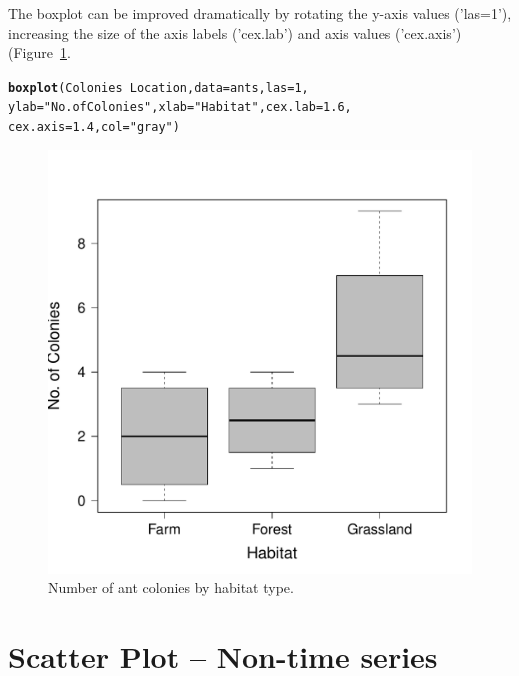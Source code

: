 \documentclass{article}\usepackage[]{graphicx}\usepackage[]{color}
\makeatletter
\def\maxwidth{ %
  \ifdim\Gin@nat@width>\linewidth
    \linewidth
  \else
    \Gin@nat@width
  \fi
}
\newcommand{\hlnum}[1]{\textcolor[rgb]{0.686,0.059,0.569}{#1}}%
\newcommand{\hlstr}[1]{\textcolor[rgb]{0.192,0.494,0.8}{#1}}%
\newcommand{\hlopt}[1]{\textcolor[rgb]{0,0,0}{#1}}%
\newcommand{\hlstd}[1]{\textcolor[rgb]{0.345,0.345,0.345}{#1}}%
\newcommand{\hlkwc}[1]{\textcolor[rgb]{0.333,0.667,0.333}{#1}}%
\newcommand{\hlkwd}[1]{\textcolor[rgb]{0.737,0.353,0.396}{\textbf{#1}}}%
\newenvironment{kframe}{%
 \def\at@end@of@kframe{}%
 \ifinner\ifhmode%
  \def\at@end@of@kframe{\end{minipage}}%
  \begin{minipage}{\columnwidth}%
 \fi\fi%
 \def\FrameCommand##1{\hskip\@totalleftmargin \hskip-\fboxsep
 \colorbox{shadecolor}{##1}\hskip-\fboxsep
     \hskip-\linewidth \hskip-\@totalleftmargin \hskip\columnwidth}%
 \MakeFramed {\advance\hsize-\width
   \@totalleftmargin\z@ \linewidth\hsize
   \@setminipage}}%
 {\par\unskip\endMakeFramed%
 \at@end@of@kframe}
\newenvironment{knitrout}{}{} %
\makeatother
\begin{document}
The boxplot can be improved dramatically by rotating the y-axis values ('las=1'), increasing the size of the axis labels ('cex.lab') and axis values ('cex.axis') (Figure~\ref{fig:boxplot}.
\begin{knitrout}
\color{fgcolor}\begin{kframe}
\begin{alltt}
\hlkwd{boxplot}\hlstd{(Colonies} \hlopt{~} \hlstd{Location,} \hlkwc{data}\hlstd{=ants,} \hlkwc{las}\hlstd{=}\hlnum{1}\hlstd{,}
        \hlkwc{ylab}\hlstd{=}\hlstr{"No. of Colonies"}\hlstd{,} \hlkwc{xlab}\hlstd{=}\hlstr{"Habitat"}\hlstd{,} \hlkwc{cex.lab}\hlstd{=}\hlnum{1.6}\hlstd{,}
        \hlkwc{cex.axis}\hlstd{=}\hlnum{1.4}\hlstd{,} \hlkwc{col}\hlstd{=}\hlstr{"gray"}\hlstd{)}
\end{alltt}
\end{kframe}\begin{figure}
\includegraphics[width=\maxwidth]{figure/boxplot-1} \caption[Number of ant colonies by habitat type]{Number of ant colonies by habitat type.}\label{fig:boxplot}
\end{figure}


\end{knitrout}




\newpage
\section{Scatter Plot -- Non-time series}
\end{document}
